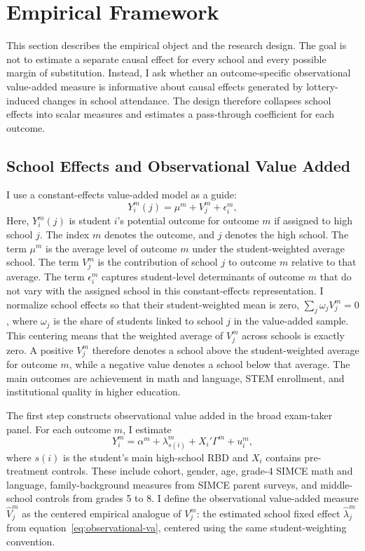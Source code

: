 \documentclass[a4paper, article, english, oneside, unknownkeysallowed, 12pt]{memoir}
\begin{document}
\clearpage 
\section{Empirical Framework}

This section describes the empirical object and the research design.
The goal is not to estimate a separate causal effect for every school and every possible margin of substitution.
Instead, I ask whether an outcome-specific observational value-added measure is informative about causal effects generated by lottery-induced changes in school attendance.
The design therefore collapses school effects into scalar measures and estimates a pass-through coefficient for each outcome.

\subsection{School Effects and Observational Value Added}

I use a constant-effects value-added model as a guide:
\begin{equation}
  Y_i^m(j) = \mu^m + V_j^m + \epsilon_i^m,
  \label{eq:potential-va}
\end{equation}
Here, $Y_i^m(j)$ is student $i$'s potential outcome for outcome $m$ if assigned to high school $j$.
The index $m$ denotes the outcome, and $j$ denotes the high school.
The term $\mu^m$ is the average level of outcome $m$ under the student-weighted average school.
The term $V_j^m$ is the contribution of school $j$ to outcome $m$ relative to that average.
The term $\epsilon_i^m$ captures student-level determinants of outcome $m$ that do not vary with the assigned school in this constant-effects representation.
I normalize school effects so that their student-weighted mean is zero, $\sum_j \omega_j V_j^m = 0$, where $\omega_j$ is the share of students linked to school $j$ in the value-added sample.
This centering means that the weighted average of $V_j^m$ across schools is exactly zero.
A positive $V_j^m$ therefore denotes a school above the student-weighted average for outcome $m$, while a negative value denotes a school below that average.
The main outcomes are achievement in math and language, STEM enrollment, and institutional quality in higher education.

The first step constructs observational value added in the broad exam-taker panel.
For each outcome $m$, I estimate
\begin{equation}
  Y_i^m = \alpha^m + \lambda_{s(i)}^m + X_i'\Gamma^m + u_i^m,
  \label{eq:observational-va}
\end{equation}
where $s(i)$ is the student's main high-school RBD and $X_i$ contains pre-treatment controls.
These include cohort, gender, age, grade-4 SIMCE math and language, family-background measures from SIMCE parent surveys, and middle-school controls from grades 5 to 8.
I define the observational value-added measure $\widehat{V}_j^m$ as the centered empirical analogue of $V_j^m$: the estimated school fixed effect $\widehat{\lambda}_j^m$ from equation~\eqref{eq:observational-va}, centered using the same student-weighting convention.
\end{document}
